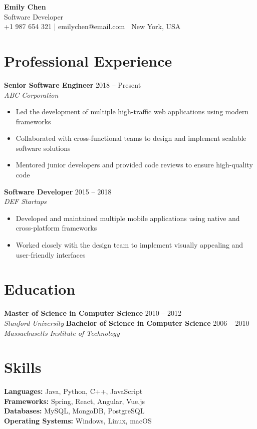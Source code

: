 \documentclass[11pt,a4paper]{article}
\begin{document}
\begin{center}
    {\Huge\textbf{Emily Chen}}\\[0.4cm]
    {\large Software Developer}\\[0.3cm]
    +1 987 654 321 | emilychen@email.com | New York, USA
\end{center}

\section{Professional Experience}
\textbf{Senior Software Engineer} \hfill 2018 -- Present\\
\textit{ABC Corporation}
\begin{itemize}[noitemsep, topsep=3pt]
    \item Led the development of multiple high-traffic web applications using modern frameworks
    \item Collaborated with cross-functional teams to design and implement scalable software solutions
    \item Mentored junior developers and provided code reviews to ensure high-quality code
\end{itemize}
\textbf{Software Developer} \hfill 2015 -- 2018\\
\textit{DEF Startups}
\begin{itemize}[noitemsep, topsep=3pt]
    \item Developed and maintained multiple mobile applications using native and cross-platform frameworks
    \item Worked closely with the design team to implement visually appealing and user-friendly interfaces
\end{itemize}

\section{Education}
\textbf{Master of Science in Computer Science} \hfill 2010 -- 2012\\
\textit{Stanford University}
\textbf{Bachelor of Science in Computer Science} \hfill 2006 -- 2010\\
\textit{Massachusetts Institute of Technology}

\section{Skills}
\textbf{Languages:} Java, Python, C++, JavaScript\\
\textbf{Frameworks:} Spring, React, Angular, Vue.js\\
\textbf{Databases:} MySQL, MongoDB, PostgreSQL\\
\textbf{Operating Systems:} Windows, Linux, macOS
\end{document}
